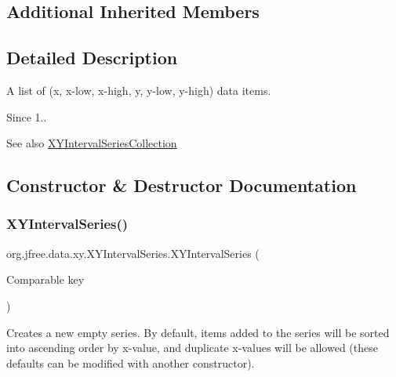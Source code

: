\subsection*{Additional Inherited Members}


\subsection{Detailed Description}
A list of (x, x-\/low, x-\/high, y, y-\/low, y-\/high) data items.

\begin{DoxySince}{Since}
1..
\end{DoxySince}
\begin{DoxySeeAlso}{See also}
\mbox{\hyperlink{classorg_1_1jfree_1_1data_1_1xy_1_1_x_y_interval_series_collection}{X\+Y\+Interval\+Series\+Collection}} 
\end{DoxySeeAlso}


\subsection{Constructor \& Destructor Documentation}
\mbox{\label{classorg_1_1jfree_1_1data_1_1xy_1_1_x_y_interval_series_a13d7c25b678591c336fe3552e7c6fc99}} 
\subsubsection{\texorpdfstring{X\+Y\+Interval\+Series()}{XYIntervalSeries()}\hspace{0.1cm}{\footnotesize\ttfamily [1/2]}}
{\footnotesize\ttfamily org.\+jfree.\+data.\+xy.\+X\+Y\+Interval\+Series.\+X\+Y\+Interval\+Series (\begin{DoxyParamCaption}\item[{Comparable}]{key }\end{DoxyParamCaption})}

Creates a new empty series. By default, items added to the series will be sorted into ascending order by x-\/value, and duplicate x-\/values will be allowed (these defaults can be modified with another constructor).


